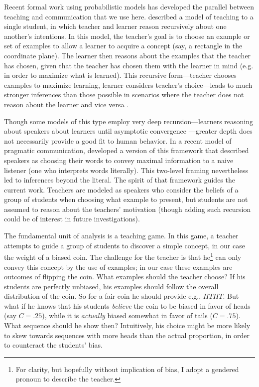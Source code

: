\documentclass[10pt,letterpaper]{article}
\begin{document}
Recent formal work using probabilistic models has developed the parallel between teaching and communication that we use here.  described a model of teaching to a single student, in which teacher and learner reason recursively about one another's intentions. In this model, the teacher's goal is to choose an example or set of examples to allow a learner to acquire a concept (say, a rectangle in the coordinate plane). The learner then reasons about the examples that the teacher has chosen, given that the teacher has chosen them with the learner in mind (e.g. in order to maximize what is learned). This recursive form---teacher chooses examples to maximize learning, learner considers teacher's choice---leads to much stronger inferences than those possible in scenarios where the teacher does not reason about the learner and vice versa \cite{shafto2012}.

Though some models of this type employ very deep recursion---learners reasoning about speakers about learners until asymptotic convergence \cite{jager2010}---greater depth does not necessarily provide a good fit to human behavior. In a recent model of pragmatic communication,  developed a version of this framework that described speakers as choosing their words to convey maximal information to a naive listener (one who interprets words literally). This two-level framing nevertheless led to inferences beyond the literal. The spirit of that framework guides the current work. Teachers are modeled as speakers who consider the beliefs of a group of students when choosing what example to present, but students are not assumed to reason about the teachers' motivation (though adding such recursion could be of interest in future investigations). 

The fundamental unit of analysis is a teaching game. In this game, a teacher attempts to guide a group of students to discover a simple concept, in our case the weight of a biased coin. The challenge for the teacher is that he\footnote{For clarity, but hopefully without implication of bias, I adopt a gendered pronoun to describe the teacher.} can only convey this concept by the use of examples; in our case these examples are outcomes of flipping the coin. What examples should the teacher choose? If his students are perfectly unbiased, his examples should follow the overall distribution of the coin. So for a fair coin he should provide e.g., $HTHT$. But what if he knows that his students \emph{believe} the coin to be biased in favor of heads (say $C=.25$), while it is \emph{actually} biased somewhat in favor of tails ($C=.75$). What sequence should he show then? Intuitively, his choice might be more likely to skew towards sequences with more heads than the actual proportion, in order to counteract the students' bias.
\end{document}
